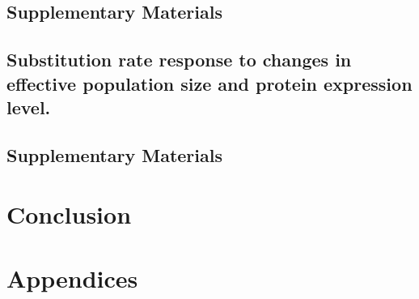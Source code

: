 \documentclass[a4paper,oneside,nobind]{thesis}
\begin{document}
\chapter{Supplementary Materials}
{\hypersetup{linkcolor=GREYDARK}\minitoc}


\chapter[Substitution rate susceptibility]{Substitution rate response to changes in effective population size and protein expression level.}
{\hypersetup{linkcolor=GREYDARK}\minitoc}
\label{chap:GenoPhenoFit}


\chapter{Supplementary Materials}
{\hypersetup{linkcolor=GREYDARK}\minitoc}


\part{Conclusion}
\label{part:discussion}

%

\part*{Appendices}


\end{document}
